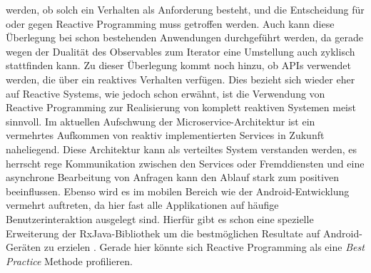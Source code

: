 werden, ob solch ein Verhalten als Anforderung besteht, und die Entscheidung für oder gegen Reactive Programming muss getroffen werden. Auch kann diese Überlegung bei schon bestehenden Anwendungen durchgeführt werden, da gerade wegen der Dualität des Observables zum Iterator eine Umstellung auch zyklisch stattfinden kann. Zu dieser Überlegung kommt noch hinzu, ob APIs verwendet werden, die über ein reaktives Verhalten verfügen. Dies bezieht sich wieder eher auf Reactive Systems, wie jedoch schon erwähnt, ist die Verwendung von Reactive Programming zur Realisierung von komplett reaktiven Systemen meist sinnvoll. Im aktuellen Aufschwung der Microservice-Architektur ist ein vermehrtes Aufkommen von reaktiv implementierten Services in Zukunft naheliegend. Diese Architektur kann als verteiltes System verstanden werden, es herrscht rege Kommunikation zwischen den Services oder Fremddiensten und eine asynchrone Bearbeitung von Anfragen kann den Ablauf stark zum positiven beeinflussen. Ebenso wird es im mobilen Bereich wie der Android-Entwicklung vermehrt auftreten, da hier fast alle Applikationen auf häufige Benutzerinteraktion ausgelegt sind. Hierfür gibt es schon eine spezielle Erweiterung der RxJava-Bibliothek um die bestmöglichen Resultate auf Android-Geräten zu erzielen \cite{android}. Gerade hier könnte sich Reactive Programming als eine \textit{Best Practice} Methode profilieren.
